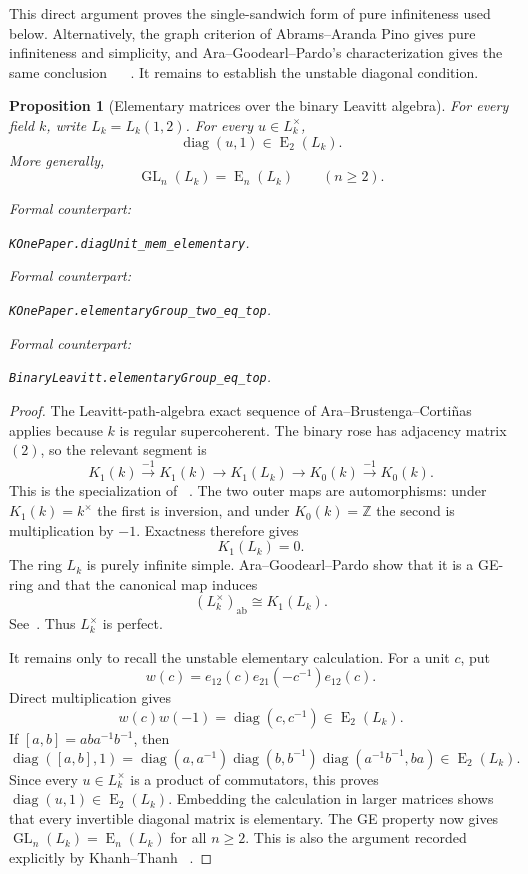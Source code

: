 \documentclass[11pt]{amsart}
\newif\ifanonymous\anonymoustrue
\newcommand{\leanrepo}{[repository link removed for anonymous review]}
\newcommand{\leanrepo}{https://github.com/SauersML/group-approximation}
\newcommand{\leanverified}[2]{%
  \par\smallskip\noindent
  {\normalfont\footnotesize\color{gray!70!black}%
  Formal counterpart:\par\nobreak\noindent
  \ifanonymous\nolinkurl{#2}\else
  \href{\leanrepo/blob/main/GroupApproximation/#1.lean}{\nolinkurl{#2}}\fi.}}
\newtheorem{proposition}[theorem]{Proposition}
\theoremstyle{definition}
\theoremstyle{plain}
\newcommand{\GL}{\operatorname{GL}}
\newcommand{\EL}{\operatorname{E}}
\newcommand{\diag}{\operatorname{diag}}
\begin{document}
This direct argument proves the single-sandwich form of pure
infiniteness used below.
Alternatively, the graph criterion of
Abrams--Aranda Pino gives pure infiniteness and simplicity, and
Ara--Goodearl--Pardo's characterization gives the same conclusion
~\cite[Theorem~11]{AbramsArandaPino}
~\cite[Theorem~1.6]{AraGoodearlPardo}.
It remains to establish the unstable diagonal condition.

\begin{proposition}[Elementary matrices over the binary Leavitt algebra]
\label{prop:diag}
For every field \(k\), write \(L_k=L_k(1,2)\).  For every
\(u\in L_k^\times\),
\[
  \diag(u,1)\in\EL_2(L_k).
\]
More generally,
\[
  \GL_n(L_k)=\EL_n(L_k)\qquad(n\ge2).
\]
\leanverified{KOne/PaperStatements}{KOnePaper.diagUnit_mem_elementary}
\leanverified{KOne/PaperStatements}{KOnePaper.elementaryGroup_two_eq_top}
\leanverified{KOne/AllRanksElementaryCore}{BinaryLeavitt.elementaryGroup_eq_top}
\end{proposition}

\begin{proof}
The Leavitt-path-algebra exact sequence of
Ara--Brustenga--Corti\~nas applies because \(k\) is regular
supercoherent.  The binary rose has adjacency matrix \((2)\), so the
relevant segment is
\[
 K_1(k)\xrightarrow{-1}K_1(k)\longrightarrow K_1(L_k)
 \longrightarrow K_0(k)\xrightarrow{-1}K_0(k).
\]
This is the specialization of
~\cite[Theorem~7.6]{AraBrustengaCortinas}.
The two outer maps are automorphisms: under
\(K_1(k)=k^\times\) the first is inversion, and under
\(K_0(k)=\mathbb Z\) the second is multiplication by \(-1\).
Exactness therefore gives
\[
 K_1(L_k)=0.
\]
The ring \(L_k\) is purely infinite simple.  Ara--Goodearl--Pardo
show that it is a GE-ring and that the canonical map induces
\[
 (L_k^\times)_{\mathrm{ab}}\cong K_1(L_k).
\]
See~\cite[Theorem~2.4 and its proof]{AraGoodearlPardo}.
Thus \(L_k^\times\) is perfect.

It remains only to recall the unstable elementary calculation.
For a unit \(c\), put
\[
 w(c)=e_{12}(c)e_{21}(-c^{-1})e_{12}(c).
\]
Direct multiplication gives
\[
 w(c)w(-1)=\diag(c,c^{-1})\in\EL_2(L_k).
\]
If \([a,b]=aba^{-1}b^{-1}\), then
\[
 \diag([a,b],1)
 =\diag(a,a^{-1})\diag(b,b^{-1})
  \diag(a^{-1}b^{-1},ba)\in\EL_2(L_k).
\]
Since every \(u\in L_k^\times\) is a product of commutators, this
proves \(\diag(u,1)\in\EL_2(L_k)\).  Embedding the calculation in
larger matrices shows that every invertible diagonal matrix is
elementary.  The GE property now gives
\(\GL_n(L_k)=\EL_n(L_k)\) for all \(n\ge2\).  This is also the argument
recorded explicitly by Khanh--Thanh
~\cite[Lemma~4.1 and Proposition~4.2]{KhanhThanh}.
\end{proof}
\end{document}
